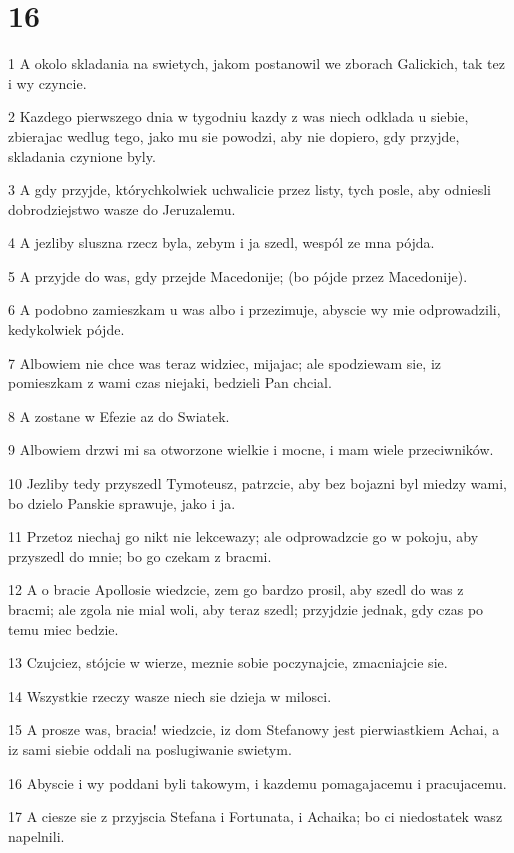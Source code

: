 \chapter{16}

\par 1 A okolo skladania na swietych, jakom postanowil we zborach Galickich, tak tez i wy czyncie.
\par 2 Kazdego pierwszego dnia w tygodniu kazdy z was niech odklada u siebie, zbierajac wedlug tego, jako mu sie powodzi, aby nie dopiero, gdy przyjde, skladania czynione byly.
\par 3 A gdy przyjde, którychkolwiek uchwalicie przez listy, tych posle, aby odniesli dobrodziejstwo wasze do Jeruzalemu.
\par 4 A jezliby sluszna rzecz byla, zebym i ja szedl, wespól ze mna pójda.
\par 5 A przyjde do was, gdy przejde Macedonije; (bo pójde przez Macedonije).
\par 6 A podobno zamieszkam u was albo i przezimuje, abyscie wy mie odprowadzili, kedykolwiek pójde.
\par 7 Albowiem nie chce was teraz widziec, mijajac; ale spodziewam sie, iz pomieszkam z wami czas niejaki, bedzieli Pan chcial.
\par 8 A zostane w Efezie az do Swiatek.
\par 9 Albowiem drzwi mi sa otworzone wielkie i mocne, i mam wiele przeciwników.
\par 10 Jezliby tedy przyszedl Tymoteusz, patrzcie, aby bez bojazni byl miedzy wami, bo dzielo Panskie sprawuje, jako i ja.
\par 11 Przetoz niechaj go nikt nie lekcewazy; ale odprowadzcie go w pokoju, aby przyszedl do mnie; bo go czekam z bracmi.
\par 12 A o bracie Apollosie wiedzcie, zem go bardzo prosil, aby szedl do was z bracmi; ale zgola nie mial woli, aby teraz szedl; przyjdzie jednak, gdy czas po temu miec bedzie.
\par 13 Czujciez, stójcie w wierze, meznie sobie poczynajcie, zmacniajcie sie.
\par 14 Wszystkie rzeczy wasze niech sie dzieja w milosci.
\par 15 A prosze was, bracia! wiedzcie, iz dom Stefanowy jest pierwiastkiem Achai, a iz sami siebie oddali na poslugiwanie swietym.
\par 16 Abyscie i wy poddani byli takowym, i kazdemu pomagajacemu i pracujacemu.
\par 17 A ciesze sie z przyjscia Stefana i Fortunata, i Achaika; bo ci niedostatek wasz napelnili.
